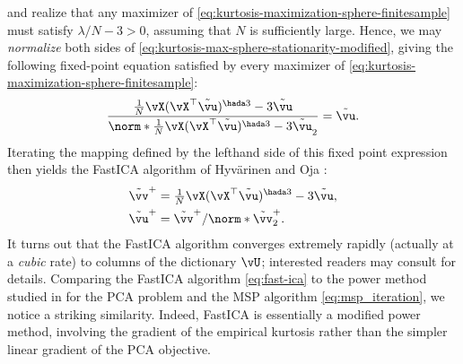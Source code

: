 \documentclass[../../book-main.tex]{subfiles}
\begin{document}
and realize that any maximizer of
\eqref{eq:kurtosis-maximization-sphere-finitesample}
must satisfy $\lambda / N - 3 > 0$,
assuming that $N$ is sufficiently large.
Hence, we may \textit{normalize} both sides of
\eqref{eq:kurtosis-max-sphere-stationarity-modified},
giving the following fixed-point equation satisfied by every
maximizer of \eqref{eq:kurtosis-maximization-sphere-finitesample}:
\begin{align}\label{eq:kurtosis-max-sphere-fxp}
    \frac{
        \frac{1}{N}\vX (\vX^\top \tilde{\vu})^{\hada 3}
        -
        3 \tilde{\vu}
    }{
        \norm*{
            \frac{1}{N}\vX (\vX^\top \tilde{\vu})^{\hada 3}
            -
            3 \tilde{\vu}
        }_2
    }
    =
    \tilde{\vu}.
\end{align}
Iterating the mapping defined by the lefthand side of this fixed
point expression then yields the FastICA algorithm of Hyv\"{a}rinen
and Oja \cite{hyvarinen-1997}:
\begin{align}
    \label{eq:fast-ica}
    \tilde{\vv}^+ &= \tfrac{1}{N}\vX (\vX^\top
    \tilde{\vu})^{\hada 3}- 3 \tilde{\vu}
    ,  \\
    \tilde{\vu}^+ &= \tilde{\vv}^+ / \norm*{\tilde{\vv}^+}_2.
\end{align}
It turns out that the FastICA algorithm converges extremely rapidly (actually at
a \textit{cubic} rate) to columns of the dictionary $\vU$; interested readers
may consult \cite{hyvarinen-1997} for details.
Comparing the FastICA algorithm \eqref{eq:fast-ica} to the power method studied
in  for the PCA problem and the MSP algorithm
\eqref{eq:msp_iteration}, we notice a striking similarity. Indeed,
FastICA is essentially a modified power method, involving the
gradient of the empirical kurtosis rather than the simpler linear
gradient of the PCA objective.
\end{document}
